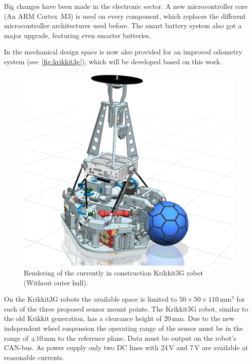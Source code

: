 \documentclass[12pt,a4paper]{article}
\begin{document}
Big changes have been made in the electronic sector.
A new microcontroller core (An ARM Cortex~M3) is used on every component, which replaces the different microcontroller architectures used before.
The smart battery system also got a major upgrade, featuring even smarter batteries.

In the mechanical design space is now also provided for an improved odometry system (see~\autoref{fig:krikkit3g}), which will be developed based on this work.

\begin{figure}[htbp]
\begin{center}  
\includegraphics[width=0.7\columnwidth]{figures/Krikkit3G.png}
\caption{\label{fig:krikkit3g}
Rendering of the currently in construction Krikkit3G robot (Without outer hull).
}   
\end{center}
\end{figure}


On the Krikkit3G robots the available space is limited to $50\times50\times110$\,mm$^3$ for each of the three proposed sensor mount points.
The Krikkit3G robot, similar to the old Krikkit generation, has a clearance height of 20\,mm.
Due to the new independent wheel suspension the operating range of the sensor must be in the range of $\pm 10$\,mm to the reference plane.
Data must be output on the robot's CAN-bus.
As power supply only two DC lines with 24\,V and 7\,V are available at reasonable currents.



\end{document}
